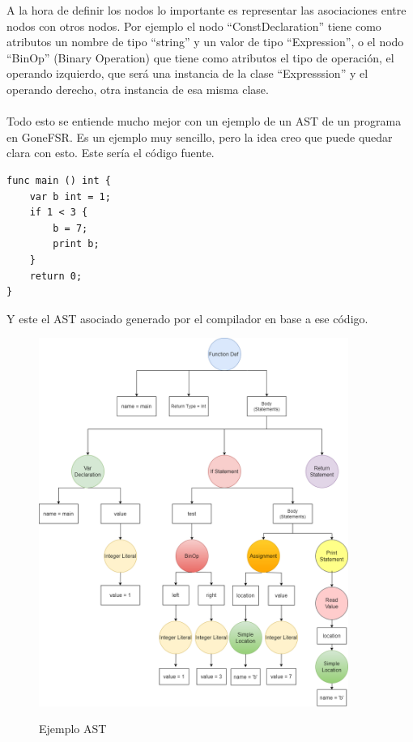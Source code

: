 A la hora de definir los nodos lo importante es representar las asociaciones entre nodos con otros nodos. Por ejemplo el nodo ``ConstDeclaration'' tiene como atributos un nombre de tipo ``string'' y un valor de tipo ``Expression'', o el nodo ``BinOp'' (Binary Operation) que tiene como atributos el tipo de operación, el operando izquierdo, que será una instancia de la clase ``Expresssion'' y el operando derecho, otra instancia de esa misma clase.\\\\ 
Todo esto se entiende mucho mejor con un ejemplo de un AST de un programa en GoneFSR. Es un ejemplo muy sencillo, pero la idea creo que puede quedar clara con esto. Este sería el código fuente.

\begin{lstlisting}[style=goneStyle]
func main () int {
    var b int = 1;
    if 1 < 3 {
        b = 7;
        print b;
    }
    return 0;
}
\end{lstlisting}


\newpage Y este el AST asociado generado por el compilador en base a ese código.
\begin{figure}[h]
    \centering
    \includegraphics[width=0.9\textwidth,keepaspectratio]{img/asttree_latexexample.png} 
    \parbox{\linewidth}{\centering Ejemplo AST}
    \label{fig:mi_imagen}
\end{figure}

